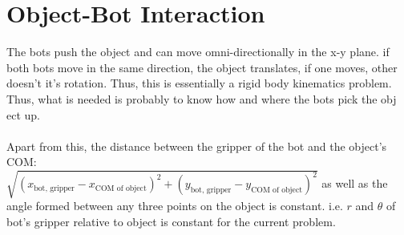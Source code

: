 \documentclass[12pt,english]{report}
\begin{document}
\section{Object-Bot Interaction}
The bots push the object and can move omni-directionally in the x-y plane. if both bots move in the same direction, the object translates, if one moves, other doesn't it's rotation. Thus, this is essentially a rigid body kinematics problem. Thus, what is needed is probably to know how and where the bots pick the obj   ect up. \\ \\
Apart from this, the distance between the gripper of the bot and the object's COM:\\ $\sqrt{(x_\text{bot, gripper} - x_\text{COM of object})^2 + (y_\text{bot, gripper} - y_\text{COM of object})^2}$ as well as the angle formed between any three points on the object is constant. i.e. $r$ and $\theta$ of bot's gripper relative to object is constant for the current problem.
\end{document}
